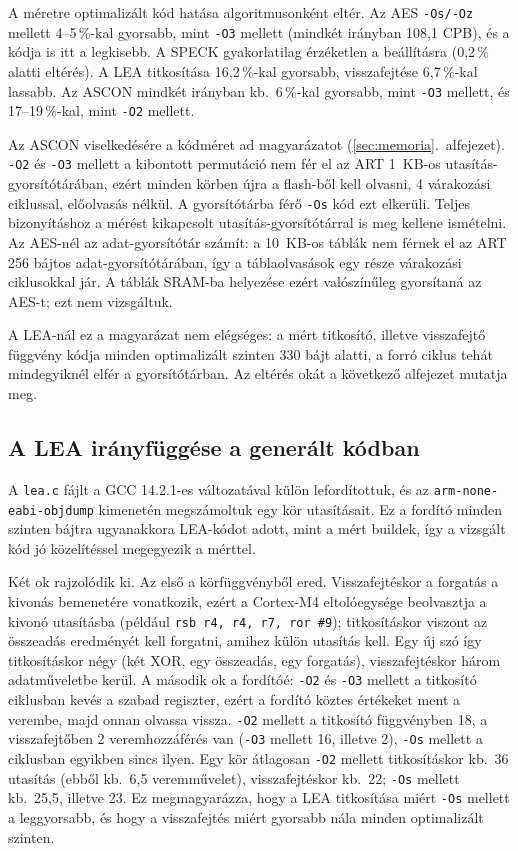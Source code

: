 \documentclass[a4paper,12pt]{report}
\theoremstyle{definition}
\theoremstyle{remark}
\begin{document}
A méretre optimalizált kód hatása algoritmusonként eltér. Az AES \texttt{-Os/-Oz} mellett 4--5\,\%-kal gyorsabb, mint \texttt{-O3} mellett (mindkét irányban 108,1 CPB), és a kódja is itt a legkisebb. A SPECK gyakorlatilag érzéketlen a beállításra (0,2\,\% alatti eltérés). A LEA titkosítása 16,2\,\%-kal gyorsabb, visszafejtése 6,7\,\%-kal lassabb. Az ASCON mindkét irányban kb.\ 6\,\%-kal gyorsabb, mint \texttt{-O3} mellett, és 17--19\,\%-kal, mint \texttt{-O2} mellett.

Az ASCON viselkedésére a kódméret ad magyarázatot (\ref{sec:memoria}.~alfejezet). \texttt{-O2} és \texttt{-O3} mellett a kibontott permutáció nem fér el az ART 1~KB-os utasítás-gyorsítótárában, ezért minden körben újra a flash-ből kell olvasni, 4 várakozási ciklussal, előolvasás nélkül. A gyorsítótárba férő \texttt{-Os} kód ezt elkerüli. Teljes bizonyításhoz a mérést kikapcsolt utasítás-gyorsítótárral is meg kellene ismételni. Az AES-nél az adat-gyorsítótár számít: a 10~KB-os táblák nem férnek el az ART 256 bájtos adat-gyorsítótárában, így a táblaolvasások egy része várakozási ciklusokkal jár. A táblák SRAM-ba helyezése ezért valószínűleg gyorsítaná az AES-t; ezt nem vizsgáltuk.

A LEA-nál ez a magyarázat nem elégséges: a mért titkosító, illetve visszafejtő függvény kódja minden optimalizált szinten 330 bájt alatti, a forró ciklus tehát mindegyiknél elfér a gyorsítótárban. Az eltérés okát a következő alfejezet mutatja meg.

\subsection{A LEA irányfüggése a generált kódban}\label{sec:lea_asm}

A \texttt{lea.c} fájlt a GCC 14.2.1-es változatával külön lefordítottuk, és az \texttt{arm-none-eabi-objdump} kimenetén megszámoltuk egy kör utasításait. Ez a fordító minden szinten bájtra ugyanakkora LEA-kódot adott, mint a mért buildek, így a vizsgált kód jó közelítéssel megegyezik a mérttel.

Két ok rajzolódik ki. Az első a körfüggvényből ered. Visszafejtéskor a forgatás a kivonás bemenetére vonatkozik, ezért a Cortex-M4 eltolóegysége beolvasztja a kivonó utasításba (például \texttt{rsb r4, r4, r7, ror \#9}); titkosításkor viszont az összeadás eredményét kell forgatni, amihez külön utasítás kell. Egy új szó így titkosításkor négy (két XOR, egy összeadás, egy forgatás), visszafejtéskor három adatműveletbe kerül. A második ok a fordítóé: \texttt{-O2} és \texttt{-O3} mellett a titkosító ciklusban kevés a szabad regiszter, ezért a fordító köztes értékeket ment a verembe, majd onnan olvassa vissza. \texttt{-O2} mellett a titkosító függvényben 18, a visszafejtőben 2 veremhozzáférés van (\texttt{-O3} mellett 16, illetve 2), \texttt{-Os} mellett a ciklusban egyikben sincs ilyen. Egy kör átlagosan \texttt{-O2} mellett titkosításkor kb.\ 36 utasítás (ebből kb.\ 6,5 veremművelet), visszafejtéskor kb.\ 22; \texttt{-Os} mellett kb.\ 25,5, illetve 23. Ez megmagyarázza, hogy a LEA titkosítása miért \texttt{-Os} mellett a leggyorsabb, és hogy a visszafejtés miért gyorsabb nála minden optimalizált szinten.
\end{document}
